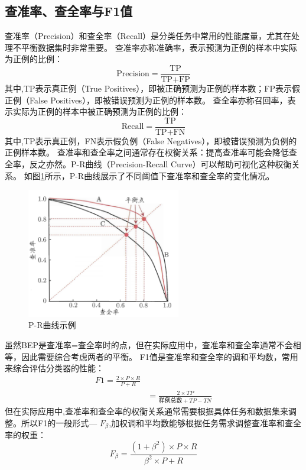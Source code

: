 \subsection{查准率、查全率与F1值}
查准率（Precision）和查全率（Recall）是分类任务中常用的性能度量，尤其在处理不平衡数据集时非常重要。
查准率亦称准确率，表示预测为正例的样本中实际为正例的比例：
\begin{equation}
    \text{Precision} = \frac{\text{TP}}{\text{TP} + \text{FP}}  
\end{equation}
其中,TP表示真正例（True Positives），即被正确预测为正例的样本数；FP表示假正例（False Positives），即被错误预测为正例的样本数。
查全率亦称召回率，表示实际为正例的样本中被正确预测为正例的比例：
\begin{equation}
    \text{Recall} = \frac{\text{TP}}{\text{TP} + \text{FN}}
\end{equation}
其中,TP表示真正例，FN表示假负例（False Negatives），即被错误预测为负例的正例样本数。
查准率和查全率之间通常存在权衡关系：提高查准率可能会降低查全率，反之亦然。P-R曲线（Precision-Recall Curve）可以帮助可视化这种权衡关系。
如图\ref{fig:pr_curve}所示，P-R曲线展示了不同阈值下查准率和查全率的变化情况。
\begin{figure}[H]
    \centering
    \includegraphics[width=0.6\textwidth]{static/images/P-R曲线图.png}
    \caption{P-R曲线示例}
    \label{fig:pr_curve}
\end{figure}
虽然BEP是查准率=查全率时的点，但在实际应用中，查准率和查全率通常不会相等，因此需要综合考虑两者的平衡。
F1值是查准率和查全率的调和平均数，常用来综合评估分类器的性能：
\begin{align}
    F1=\frac{2 \times P \times R}{P+R} \nonumber \\
    &= \frac{2 \times TP}{\text{样例总数}+TP-TN}
\end{align}
但在实际应用中,查准率和查全率的权衡关系通常需要根据具体任务和数据集来调整。所以F1的一般形式--- $F_\beta$,加权调和平均数能够根据任务需求调整查准率和查全率的权重：
\begin{equation}
    F_\beta = \frac{(1+\beta^2) \times P \times R}{\beta^2 \times P + R}
\end{equation}

